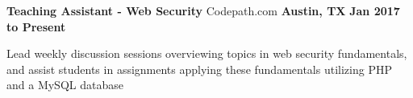 \begin{cventries}
	\cventry
		{\normalsize \textbf{Teaching Assistant - Web Security}}
		{\large Codepath.com}
		{\normalsize \textbf{Austin, TX}}
		{\normalsize \textbf{Jan 2017 to Present}}
		{
			\begin{cvitems}
				\item {\normalsize Lead weekly discussion sessions overviewing topics in web security fundamentals, and assist students in assignments applying these fundamentals utilizing PHP and a MySQL database}
			\end{cvitems}
		}
\end{cventries}
